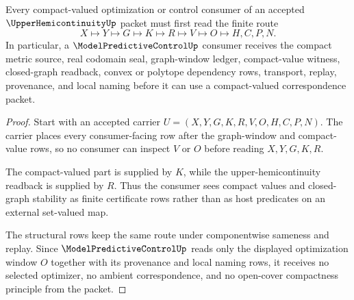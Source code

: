 \begin{theorem}
\label{thm:upperhemicontinuity-compact-valued-correspondence-handoff}
Every compact-valued optimization or control consumer of an accepted $\UpperHemicontinuityUp$ packet must first read the finite route
$$
X \longmapsto Y \longmapsto G \longmapsto K \longmapsto R \longmapsto V \longmapsto O \longmapsto H,C,P,N .
$$
In particular, a $\ModelPredictiveControlUp$ consumer receives the compact metric source, real codomain seal, graph-window ledger, compact-value witness, closed-graph readback, convex or polytope dependency rows, transport, replay, provenance, and local naming before it can use a compact-valued correspondence packet.
\end{theorem}
\begin{proof}
Start with an accepted carrier $U=(X,Y,G,K,R,V,O,H,C,P,N)$. The carrier places every consumer-facing row after the graph-window and compact-value rows, so no consumer can inspect $V$ or $O$ before reading $X,Y,G,K,R$.

The compact-valued part is supplied by $K$, while the upper-hemicontinuity readback is supplied by $R$. Thus the consumer sees compact values and closed-graph stability as finite certificate rows rather than as host predicates on an external set-valued map.

The structural rows keep the same route under componentwise sameness and replay. Since $\ModelPredictiveControlUp$ reads only the displayed optimization window $O$ together with its provenance and local naming rows, it receives no selected optimizer, no ambient correspondence, and no open-cover compactness principle from the packet.
\end{proof}

